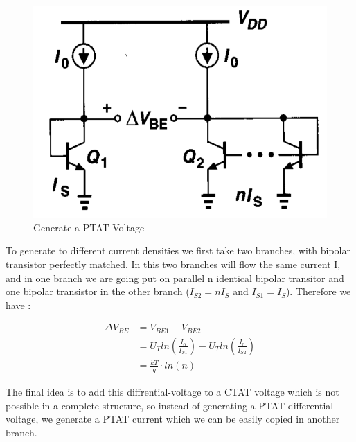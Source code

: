 \documentclass[11pt,a4paper]{report}
\begin{document}
\begin{figure}[h]
  \begin{center}
    \includegraphics[scale=0.35]{photo/PTAT_1}
  \end{center}
  \caption{Generate a PTAT Voltage}
  \label{PTAT_1}
\end{figure}

To generate to different current densities we first take two branches, with bipolar transistor perfectly matched. In this two branches will flow the same current I, and in one branch we are going put on parallel n identical bipolar transitor and one bipolar transistor in the other branch ($I_{S2} = n I_{S}$ and $I_{S1} = I_{S}$).
Therefore we have :

\begin{align}
  \Delta V_{BE} & = V_{BE1} - V_{BE2} \\
              & = U_T ln \left( \frac{I_0}{I_{S1}}\right) - U_T ln \left( \frac{I_0}{I_{S2}}\right) \\
              & = \frac{kT}{q} \cdot ln(n)
\end{align}



\newpage

The final idea is to add this diffrential-voltage to a CTAT voltage which is not possible in a complete structure, so instead of generating a PTAT differential voltage, we generate a PTAT current which we can be easily copied in another branch.
\end{document}
